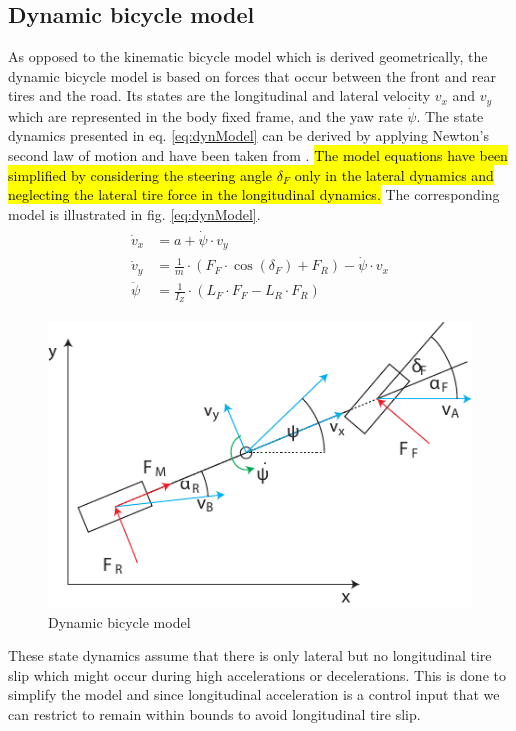 \subsection{Dynamic bicycle model}
As opposed to the kinematic bicycle model which is derived geometrically, the dynamic bicycle model is based on forces that occur between the front and rear tires and the road. Its states are the longitudinal and lateral velocity $v_x$ and $v_y$ which are represented in the body fixed frame, and the yaw rate $\dot \psi$. The state dynamics presented in eq. \ref{eq:dynModel} can be derived by applying Newton's second law of motion and have been taken from \cite{Kong2015}. \hl{The model equations have been simplified by considering the steering angle $\delta_F$ only in the lateral dynamics and neglecting the lateral tire force in the longitudinal dynamics.} The corresponding model is illustrated in fig. \ref{eq:dynModel}.
\begin{align}
\begin{split}
\label{eq:dynModel}
    \dot v_x &= a+\dot \psi\cdot v_y\\
    \dot v_y &= \frac{1}{m}\cdot (F_F\cdot \cos(\delta_F)+F_R)-\dot\psi\cdot v_x\\
    \ddot \psi &= \frac{1}{I_Z}\cdot(L_F\cdot F_F - L_R\cdot F_R)
\end{split}
\end{align}
\begin{figure}[ht]
	\centering
  	\includegraphics{../../Figures/Models/DynModel.pdf}
	\caption{Dynamic bicycle model}
	\label{fig:dynModel}
\end{figure}
These state dynamics assume that there is only lateral but no longitudinal tire slip which might occur during high accelerations or decelerations. This is done to simplify the model and since longitudinal acceleration is a control input that we can restrict to remain within bounds to avoid longitudinal tire slip.
